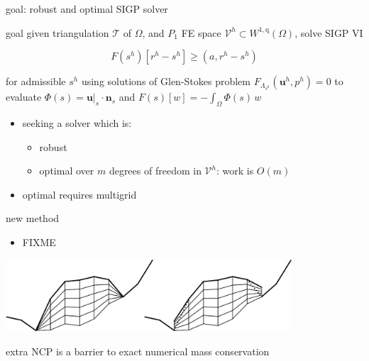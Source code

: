 \documentclass{beamer}
\newcommand{\bn}{\mathbf{n}}
\newcommand{\bu}{\mathbf{u}}
\newcommand{\ip}[2]{\left(#1,#2\right)}
\newcommand{\qq}{{\text{q}}}
\begin{document}
\begin{frame}{goal: robust and optimal SIGP solver}

\begin{block}{goal}
given triangulation $\mathcal{T}$ of $\Omega$, and $P_1$ FE space $\mathcal{V}^h \subset W^{1,\qq}(\Omega)$, solve SIGP VI

$$F(s^h)[r^h - s^h] \ge \ip{a}{r^h-s^h}$$

for admissible $s^h$ using solutions of Glen-Stokes problem $F_{\Lambda_{s^h}}(\bu^h,p^h)=0$ to evaluate $\Phi(s)=\bu|_s\cdot\bn_s$ and $F(s)[w] =- \int_\Omega \Phi(s)\, w $
\end{block}

\begin{itemize}
\item seeking a solver which is:
    \begin{itemize}
    \item \alert{robust}
    \item \alert{optimal} over $m$ degrees of freedom in $\mathcal{V}^h$: work is $O(m)$
    \end{itemize}
\item optimal requires multigrid
\end{itemize}
\end{frame}


\begin{frame}{new method}

\begin{itemize}
\item FIXME \cite{BuelerMitchell2022}
\end{itemize}

\includegraphics[width=0.8\textwidth]{figs/extruded.png}
\end{frame}


\begin{frame}{extra}
 NCP is a barrier to exact numerical mass conservation \cite{Bueler2021conservation}
\end{frame}

\end{document}

